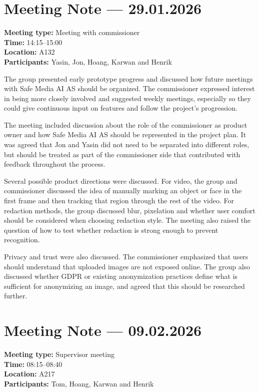 \section{Meeting Note --- 29.01.2026}
\label{app:meeting-2026-01-29}
\textbf{Meeting type:} Meeting with commissioner\\
\textbf{Time:} 14:15--15:00\\
\textbf{Location:} A132\\
\textbf{Participants:} Yasin, Jon, Hoang, Karwan and Henrik

The group presented early prototype progress and discussed how future meetings with Safe Media AI AS should be organized. The commissioner expressed interest in being more closely involved and suggested weekly meetings, especially so they could give continuous input on features and follow the project's progression.

The meeting included discussion about the role of the commissioner as product owner and how Safe Media AI AS should be represented in the project plan. It was agreed that Jon and Yasin did not need to be separated into different roles, but should be treated as part of the commissioner side that contributed with feedback throughout the process.

Several possible product directions were discussed. For video, the group and commissioner discussed the idea of manually marking an object or face in the first frame and then tracking that region through the rest of the video. For redaction methods, the group discussed blur, pixelation and whether user comfort should be considered when choosing redaction style. The meeting also raised the question of how to test whether redaction is strong enough to prevent recognition.

Privacy and trust were also discussed. The commissioner emphasized that users should understand that uploaded images are not exposed online. The group also discussed whether GDPR or existing anonymization practices define what is sufficient for anonymizing an image, and agreed that this should be researched further.

\section{Meeting Note --- 09.02.2026}
\label{app:meeting-2026-02-09}
\textbf{Meeting type:} Supervisor meeting\\
\textbf{Time:} 08:15--08:40\\
\textbf{Location:} A217\\
\textbf{Participants:} Tom, Hoang, Karwan and Henrik

